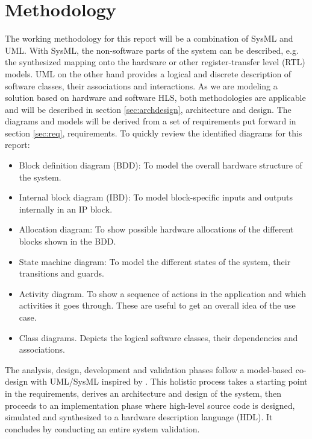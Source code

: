 \section{Methodology}

The working methodology for this report will be a combination of SysML and UML. With SysML, the non-software parts of the system can be described, e.g. the synthesized mapping onto the hardware or other register-transfer level (RTL) models. UML on the other hand provides a logical and discrete description of software classes, their associations and interactions. As we are modeling a solution based on hardware and software HLS, both methodologies are applicable and will be described in section \ref{sec:archdesign}, architecture and design. The diagrams and models will be derived from a set of requirements put forward in section \ref{sec:req}, requirements. To quickly review the identified diagrams for this report:

\begin{itemize}
	\item Block definition diagram (BDD): To model the overall hardware structure of the system.
	\item Internal block diagram (IBD): To model block-specific inputs and outputs internally in an IP block.
	\item Allocation diagram: To show possible hardware allocations of the different blocks shown in the BDD.
	\item State machine diagram: To model the different states of the system, their transitions and guards.
	\item Activity diagram. To show a sequence of actions in the application and which activities it goes through. These are useful to get an overall idea of the use case.
	\item Class diagrams. Depicts the logical software classes, their dependencies and associations.
\end{itemize}

The analysis, design, development and validation phases follow a model-based co-design with UML/SysML inspired by \cite{codesign}. This holistic process takes a starting point in the requirements, derives an architecture and design of the system, then proceeds to an implementation phase where high-level source code is designed, simulated and synthesized to a hardware description language (HDL). It concludes by conducting an entire system validation.
